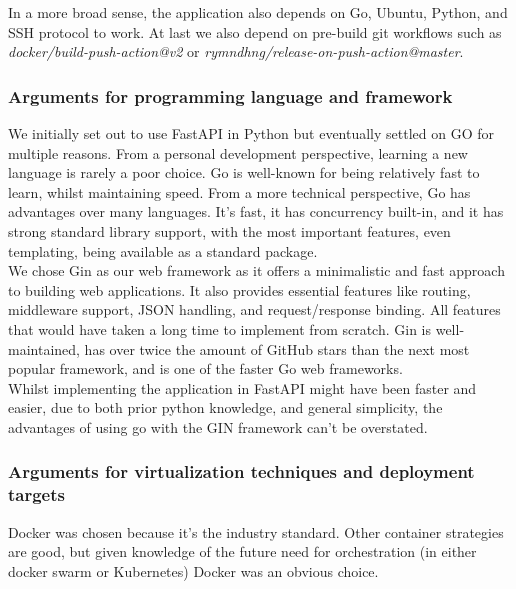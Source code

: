 In a more broad sense, the application also depends on Go, Ubuntu, Python, and SSH protocol to work. At last we 
also depend on pre-build git workflows such as \textit{docker/build-push-action@v2} or \textit{rymndhng/release-on-push-action@master}.

\subsubsection{Arguments for programming language and framework}
We initially set out to use FastAPI in Python but eventually settled on GO for multiple reasons. From a personal 
development perspective, learning a new language is rarely a poor choice. Go is well-known for being relatively 
fast to learn, whilst maintaining speed. From a more technical perspective, Go has advantages over many languages. 
It's fast, it has concurrency built-in, and it has strong standard library support, with the most important features, 
even templating, being available as a standard package. \\

We chose Gin as our web framework as it offers a minimalistic and fast approach to building web applications. 
It also provides essential features like routing, middleware support, JSON handling, and request/response binding. All features that would have taken a long time to implement from scratch. Gin is well-maintained, has over twice the 
amount of GitHub stars than the next most popular framework, and is one of the faster Go web frameworks.\\

Whilst implementing the application in FastAPI might have been faster and easier, due to both prior python 
knowledge, and general simplicity, the advantages of using go with the GIN framework can't be overstated.  

\subsubsection{Arguments for virtualization techniques and deployment targets}
Docker was chosen because it's the industry standard. Other container strategies are good, but given knowledge 
of the future need for orchestration (in either docker swarm or Kubernetes) Docker was an obvious choice.\\

